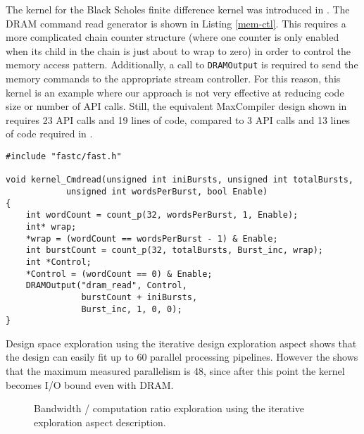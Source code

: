  The \FAST{} kernel for the Black Scholes finite difference kernel was
 introduced in . The DRAM command read generator is
 shown in Listing \ref{mem-ctl}. This requires a more complicated
 chain counter structure (where one counter is only enabled when its
 child in the chain is just about to wrap to zero) in order to control
 the memory access pattern. Additionally, a call to \texttt{DRAMOutput}
 is required to send the memory commands to the appropriate stream
 controller. For this reason, this kernel is an example where our
 approach is not very effective at reducing code size or number of API
 calls. Still, the equivalent MaxCompiler design shown in
  requires 23 API calls and 19 lines of
 code, compared to 3 API calls and 13 lines of code required in \FAST{}.

\begin{lstlisting}[caption={\FAST{} Memory Controller Kernel}, label={mem-ctl}]
#include "fastc/fast.h"

void kernel_Cmdread(unsigned int iniBursts, unsigned int totalBursts,
		    unsigned int wordsPerBurst, bool Enable)
{
    int wordCount = count_p(32, wordsPerBurst, 1, Enable);
    int* wrap;
    *wrap = (wordCount == wordsPerBurst - 1) & Enable;
    int burstCount = count_p(32, totalBursts, Burst_inc, wrap);
    int *Control;
    *Control = (wordCount == 0) & Enable;
    DRAMOutput("dram_read", Control,
               burstCount + iniBursts,
               Burst_inc, 1, 0, 0);
}

\end{lstlisting}

 Design space exploration using the iterative design exploration
 aspect shows that the design can easily fit up to 60 parallel
 processing pipelines. However the  shows that
 the maximum measured parallelism is 48, since after this point the
 kernel becomes I/O bound even with DRAM.

\begin{figure}[!h]
  \centering
  \caption{Bandwidth / computation ratio exploration using the
    iterative exploration aspect description.}
  \label{fig:bscoles-exp}
\end{figure}





